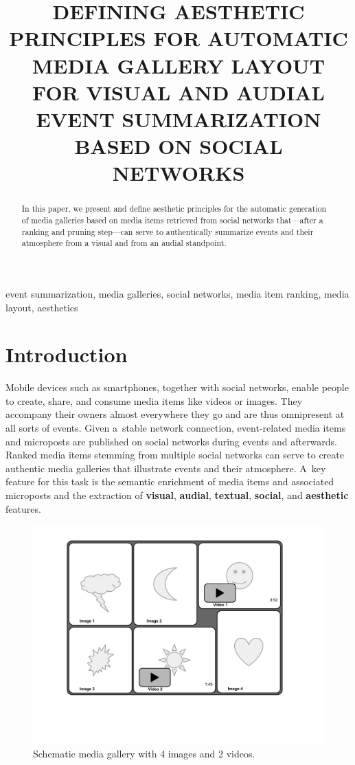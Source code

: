 \documentclass{article}
\title{DEFINING AESTHETIC PRINCIPLES FOR AUTOMATIC MEDIA GALLERY LAYOUT\\
FOR VISUAL AND AUDIAL EVENT SUMMARIZATION BASED ON SOCIAL NETWORKS}
\begin{document}
%
\maketitle
%
\begin{abstract}
In this paper, we present and define aesthetic principles
for the automatic generation of media galleries
based on media items retrieved from social networks
that---after a ranking and pruning step---can serve to authentically
summarize events and their atmosphere from a visual
and from an audial standpoint. 
\end{abstract}
%
\begin{keywords}
event summarization, media galleries, social networks,
media item ranking, media layout, aesthetics
\end{keywords}
%
\section{Introduction}
Mobile devices such as smartphones, together with social networks,
enable people to create, share, and consume media items
like videos or images.
They accompany their owners almost everywhere they go
and are thus omnipresent at all sorts of events.
Given a~stable network connection, event-related media items
and microposts are published on social networks
during events and afterwards.
Ranked media items stemming from multiple social networks
can serve to create authentic media galleries
that illustrate events and their atmosphere.
A~key feature for this task is the semantic enrichment
of media items and associated microposts
and the extraction of \textbf{visual}, \textbf{audial},
\textbf{textual}, \textbf{social}, and \textbf{aesthetic} features.

\begin{figure}[htb]
\centering
\includegraphics[trim=20mm 40mm 20mm 10mm, clip, width=0.75\columnwidth]{media-gallery.pdf}
\caption{Schematic media gallery with 4 images and 2 videos.}
\label{fig:media-gallery}
\end{figure}
\end{document}
